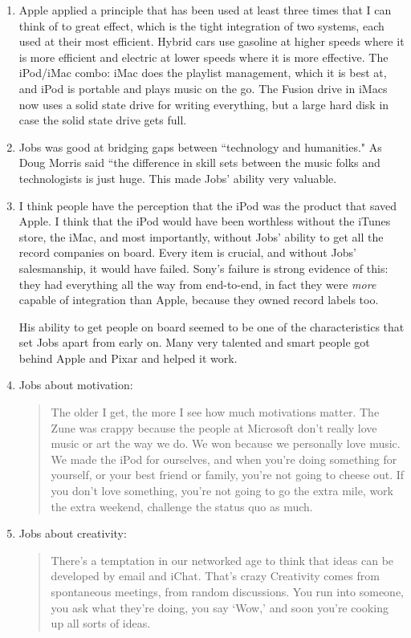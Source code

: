 \documentclass[11pt, oneside]{article}   	%
\begin{document}
\begin{enumerate}
\item Apple applied a principle that has been used at least three times that I can think of to great effect, which is the tight integration of two systems, each used at their most efficient.  Hybrid cars use gasoline at higher speeds where it is more efficient and electric at lower speeds where it is more effective.  The iPod/iMac combo: iMac does the playlist management, which it is best at, and iPod is portable and plays music on the go.  The Fusion drive in iMacs now uses a solid state drive for writing everything, but a large hard disk in case the solid state drive gets full.  %

\item Jobs was good at bridging gaps between ``technology and humanities."  As Doug Morris said ``the difference in skill sets between the music folks and technologists is just huge.  This  made Jobs' ability very valuable.  %

\item I think people have the perception that the iPod was the product that saved Apple.  I think that the iPod would have been worthless without the iTunes store, the iMac, and most importantly, without Jobs' ability to get all the record companies on board.  Every item is crucial, and without Jobs' salesmanship, it would have failed.  Sony's failure is strong evidence of this: they had everything all the way from end-to-end, in fact they were \textit{more} capable of integration than Apple, because they owned record labels too.

His ability to get people on board seemed to be one of the characteristics that set Jobs apart from early on.  Many very talented and smart people got behind Apple and Pixar and helped it work.  

\item Jobs about motivation: \begin{quote} The older I get, the more I see how much motivations matter.  The Zune was crappy because the people at Microsoft don't really love music or art the way we do.  We won because we personally love music.  We made the iPod for ourselves, and when you're doing something for yourself, or your best friend or family, you're not going to cheese out.  If you don't love something, you're not going to go the extra mile, work the extra weekend, challenge the status quo as much.  \end{quote}    

\item Jobs about creativity: \begin{quote} There's a temptation in our networked age to think that ideas can be developed by email and iChat.  That's crazy Creativity comes from spontaneous meetings, from random discussions.  You run into someone, you ask what they're doing, you say `Wow,' and soon you're cooking up all sorts of ideas. \end{quote}    
\end{enumerate}
\end{document}
